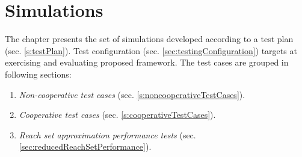 \chapter{Simulations}\label{Simulations}


\noindent The chapter presents the set of simulations developed according to a test plan (sec. \ref{s:testPlan}). Test configuration (sec. \ref{sec:testingConfiguration}) targets at exercising and evaluating proposed framework. The test cases are grouped in following sections:
\begin{enumerate}
    \item \emph{Non-cooperative test cases} (sec. \ref{s:noncooperativeTestCases}).
    \item \emph{Cooperative test cases} (sec. \ref{s:cooperativeTestCases}).
    \item \emph{Reach set approximation performance tests} (sec. \ref{sec:reducedReachSetPerformance}).
\end{enumerate}
